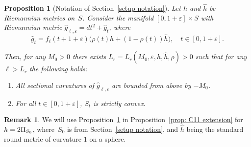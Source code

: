 \documentclass[10pt]{amsart}
\newenvironment{enumeratea}
{\bgroup\def\theenumi{\alph{enumi}}\begin{enumerate}}
{\end{enumerate}\egroup}
\newtheorem{proposition}[theorem]{Proposition}
\theoremstyle{definition}
\newtheorem{remark}[theorem]{Remark}
\let\eps\varepsilon
\newcommand{\RomanNumeralCaps}[1]
{\MakeUppercase{\romannumeral #1}}
\newcommand{\II}{\textup{\RomanNumeralCaps{2}}}
\renewcommand{\>}{{\rangle}}
\newcommand{\<}{{\langle}}
\begin{document}
\begin{proposition}[Notation of Section~\ref{setup notation}]
\label{prop: sectional 2}Let $h$ and $\hat h$ be Riemannian metrics on~$S$. Consider the manifold $[0,1+\eps]\times S$ with Riemannian metric $\hat g_{\ell,\eps} = dt^2+\hat g_t$, where
\[
\hat g_t = f_\ell(t+1+\eps)\bigl(\rho(t)h+(1-\rho(t))\hat h\bigr),\quad t\in[0,1+\eps].
\]

Then, for any $M_0>0$ there exists $L_r = L_r(M_0,\eps,h,\hat h,\rho)>0$ such that for any $\ell>L_r$ the following holds:
\begin{enumeratea}
\item\label{all negative} All sectional curvatures of $\hat g_{\ell,\eps}$ are bounded from above by $-M_0$.
\item\label{gen convexity 2} For all $t\in[0,1+\eps]$, $S_t$ is strictly convex.
\end{enumeratea}
\end{proposition}

\begin{remark}
We will use Proposition~\ref{prop: sectional 2} in Proposition~\ref{prop: C11 extension} for $h=2\II_{S_0}$, where~$S_0$ is from Section~\ref{setup notation}, and $\hat h$ being the standard round metric of curvature $1$ on a sphere.
\end{remark}
\end{document}
